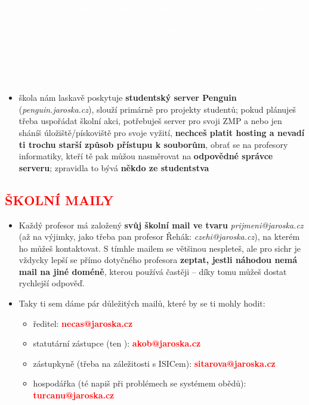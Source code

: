 \documentclass{article}
\newcommand{\podnadpis}[1]{
  \subsection*{\textcolor{red}{#1}}
}
\begin{document}
\begin{redbox}
    \textcolor{white}{S připojováním osobních notebooků na školní wifi to bývalo v minulosti trochu složitější. Naštěstí v minulém školním roce naše zastaralá síť přošla značnými úpravami, takže už by to teď neměl být problém. Stačí se přihlásit na síť \textit{JAROSKA\_S} se stejným jménem a heslem, jako se přihlašuješ v informatice. Pokud si heslo na počítač změníš, změní se ti i heslo na wifi! V případě, že něco nebude fungovat, zajdi za panem profesorem Blahou (jehož kabinet si můžeš najít na plánku školy) a popros ho o pomoc.}
\end{redbox}

\begin{itemize}[leftmargin=10pt]
  \item  škola nám laskavě poskytuje \textbf{studentský server Penguin} (\textit{penguin.jaroska.cz}), slouží primárně pro projekty studentů; pokud plánuješ třeba uspořádat školní akci, potřebuješ server pro svoji ZMP a nebo jen sháníš úložiště/pískoviště pro svoje vyžití, \textbf{nechceš platit hosting a nevadí ti trochu starší způsob přístupu k souborům}, obrať se na profesory informatiky, kteří tě pak můžou nasměrovat na \textbf{odpovědné správce serveru}; zpravidla to bývá \textbf{někdo ze studentstva}
\end{itemize}

\podnadpis{ŠKOLNÍ MAILY}
\begin{itemize}[leftmargin=10pt]
  \item Každý profesor má založený \textbf{svůj školní mail ve tvaru} \textit{prijmeni@jaroska.cz} (až na výjimky, jako třeba pan profesor Řehák: \textit{czehi@jaroska.cz}), na kterém ho můžeš kontaktovat. S tímhle mailem se většinou nespleteš, ale pro sichr je vždycky lepší se přímo dotyčného profesora \textbf{zeptat, jestli náhodou nemá mail na jiné doméně}, kterou používá častěji -- díky tomu můžeš dostat rychlejší odpověď.
  \item  Taky ti sem dáme pár důležitých mailů, které by se ti mohly hodit:
  \begin{itemize}[leftmargin=0pt]
    \item  ředitel: \textcolor{red}{\textbf{necas@jaroska.cz}}
    \item statutární zástupce (ten ): \textcolor{red}{\textbf{akob@jaroska.cz}}
    \item zástupkyně (třeba na záležitosti s ISICem): \textcolor{red}{\textbf{sitarova@jaroska.cz}}
    \item  hospodářka (té napiš při problémech se systémem obědů): \textcolor{red}{\textbf{turcanu@jaroska.cz}}
  \end{itemize}
\end{itemize}
\end{document}
